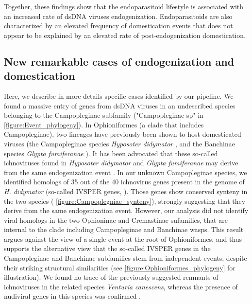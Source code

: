 Together, these findings show that the endoparasitoid lifestyle is associated with an increased rate of dsDNA viruses endogenization. Endoparasitoids are also characterized by an elevated frequency of domestication events that does not appear to be explained by an elevated rate of post-endogenization domestication. 

\subsection{New remarkable cases of endogenization and domestication}

Here, we describe in more details specific cases identified by our pipeline. We found a massive entry of genes from dsDNA viruses in an undescribed species belonging to the Campopleginae subfamily ("Campopleginae sp" in \figurename{ \ref{figure:Event_phylogeny}}). In Ophioniformes (a clade that includes Campopleginae), two lineages have previously been shown to host domesticated viruses (the Campopleginae species \textit{Hyposoter didymator} \citep{volkoff_analysis_2010-1}, and the Banchinae species \textit{Glypta fumiferanae} \citep{beliveau_genomic_2015-1}). It has been advocated that these so-called ichnoviruses found in \textit{Hyposoter didymator} and \textit{Glypta fumiferanae} may derive from the same endogenization event \citep{beliveau_genomic_2015-1}. In our unknown Campopleginae species, we identified homologs of 35 out of the 40 ichnovirus genes present in the genome of \textit{H. didymator} (so-called IVSPER genes, \citep{volkoff_analysis_2010}). Those genes show conserved synteny in the two species (\figurename{ \ref{figure:Campoplegniae_synteny}}), strongly suggesting that they derive from the same endogenization event. However, our analysis did not identify viral homologs in the two Ophioninae and Cremastinae sufamilies, that are internal to the clade including Campopleginae and Banchinae wasps. This result argues against the view of a single event at the root of Ophioniformes, and thus supports the alternative view \citep{burke_endogenization_2020-1} that the so-called IVSPER genes  in the Campopleginae and Banchinae subfamilies stem from independent events, despite their striking structural similarities (see \figurename{\ref{figure:Ophioniformes_phylogeny}} for illustration). We found no trace of the previously suggested remnants of ichnoviruses in the related species \textit{Venturia canescens}, whereas the presence of nudiviral genes in this species was confirmed \citep{pichon_recurrent_2015}.\\

